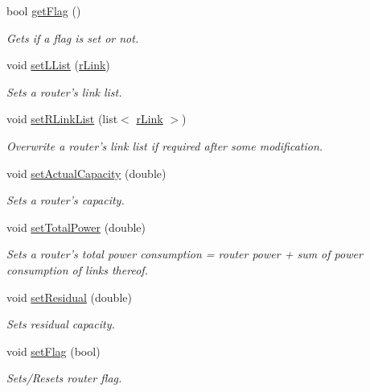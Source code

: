 \begin{DoxyCompactItemize}
bool \hyperlink{classrouter_aaa3d78b2556a095f725d5a2202265d55}{getFlag} ()
\begin{DoxyCompactList}\small\item\em Gets if a flag is set or not. \item\end{DoxyCompactList}\item 
void \hyperlink{classrouter_a20f58c16edd3ca8d8afb73cf9f27f549}{setLList} (\hyperlink{classrLink}{rLink})
\begin{DoxyCompactList}\small\item\em Sets a router's link list. \item\end{DoxyCompactList}\item 
void \hyperlink{classrouter_a28908a05b7e50a0ab45481c94c8042a8}{setRLinkList} (list$<$ \hyperlink{classrLink}{rLink} $>$)
\begin{DoxyCompactList}\small\item\em Overwrite a router's link list if required after some modification. \item\end{DoxyCompactList}\item 
void \hyperlink{classrouter_a90c5339e7bed5597f06be903305ef588}{setActualCapacity} (double)
\begin{DoxyCompactList}\small\item\em Sets a router's capacity. \item\end{DoxyCompactList}\item 
void \hyperlink{classrouter_a9b06f4e341fea7bf5a853b0a2caf1d2a}{setTotalPower} (double)
\begin{DoxyCompactList}\small\item\em Sets a router's total power consumption = router power + sum of power consumption of links thereof. \item\end{DoxyCompactList}\item 
void \hyperlink{classrouter_ac839466bae2c42cee73a33b4d185f48a}{setResidual} (double)
\begin{DoxyCompactList}\small\item\em Sets residual capacity. \item\end{DoxyCompactList}\item 
void \hyperlink{classrouter_ab4e2af9a6d0412fa8d3e6cea8b411f7c}{setFlag} (bool)
\begin{DoxyCompactList}\small\item\em Sets/Resets router flag. \item\end{DoxyCompactList}\end{DoxyCompactItemize}


